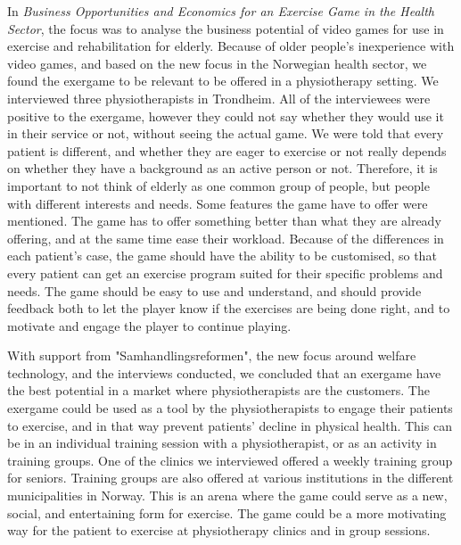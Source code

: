 In \emph{Business Opportunities and Economics for an Exercise Game in the Health Sector}, the focus was to analyse the business potential of video games for use in exercise and rehabilitation for elderly.  Because of older people's inexperience with video games, and based on the new focus in the Norwegian health sector, we found the exergame to be relevant to be offered in a physiotherapy setting. We interviewed three physiotherapists in Trondheim. All of the interviewees were positive to the exergame, however they could not say whether they would use it in their service or not, without seeing the actual game. We were told that every patient is different, and whether they are eager to exercise or not really depends on whether they have a background as an active person or not. Therefore, it is important to not think of elderly as one common group of people, but people with different interests and needs. Some features the game have to offer were mentioned. The game has to offer something better than what they are already offering, and at the same time ease their workload. Because of the differences in each patient's case, the game should have the ability to be customised, so that every patient can get an exercise program suited for their specific problems and needs. The game should be easy to use and understand, and should provide feedback both to let the player know if the exercises are being done right, and to motivate and engage the player to continue playing. 

With support from "Samhandlingsreformen", the new focus around welfare technology, and the interviews conducted, we concluded that an exergame have the best potential in a market where physiotherapists are the customers. The exergame could be used as a tool by the physiotherapists to engage their patients to exercise, and in that way prevent patients' decline in physical health. This can be in an individual training session with a physiotherapist, or as an activity in training groups. One of the clinics we interviewed offered a weekly training group for seniors. Training groups are also offered at various institutions in the different municipalities in Norway. This is an arena where the game could serve as a new, social, and entertaining form for exercise. The game could be a more motivating way for the patient to exercise at physiotherapy clinics and in group sessions. 

